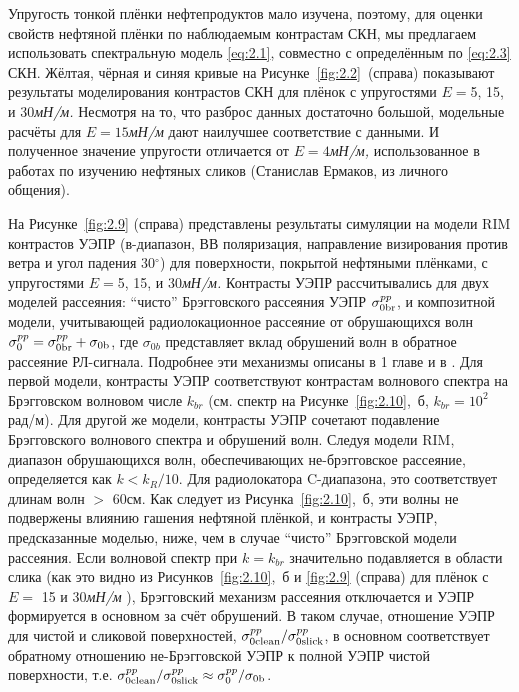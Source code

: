 Упругость тонкой плёнки нефтепродуктов мало изучена, поэтому, для оценки свойств нефтяной плёнки по наблюдаемым контрастам СКН, мы предлагаем использовать спектральную модель \eqref{eq:2.1}, совместно с определённым по \eqref{eq:2.3} СКН. Жёлтая, чёрная и синяя кривые на Рисунке~\ref{fig:2.2}~(справа) показывают результаты моделирования контрастов СКН для плёнок с упругостями $E=$5, 15, и 30\textit{мН/м.} Несмотря на то, что разброс данных достаточно большой, модельные расчёты для $E=15$\textit{мН/м }дают наилучшее соответствие с данными. И полученное значение упругости отличается от $E=4$\textit{мН/м,} использованное в работах по изучению нефтяных сликов (Станислав Ермаков, из личного общения).

На Рисунке~\ref{fig:2.9} (справа) представлены результаты симуляции на модели RIM контрастов УЭПР (в-диапазон, ВВ поляризация, направление визирования против ветра и угол падения 30${}^\circ$) для поверхности, покрытой нефтяными плёнками, с упругостями $E=$5, 15, и 30\textit{мН/м.} Контрасты УЭПР рассчитывались для двух моделей рассеяния: ``чисто'' Брэгговского рассеяния УЭПР ${\rm \sigma }_{0{\rm br}}^{pp} $, и композитной модели, учитывающей радиолокационное рассеяние от обрушающихся волн ${\rm \sigma }_{0}^{pp} ={\rm \sigma }_{0{\rm br}}^{pp} +{\rm \sigma }_{0{\rm b}} $, где $\sigma _{0b} $ представляет вклад обрушений волн в обратное рассеяние РЛ-сигнала. Подробнее эти механизмы описаны в 1 главе и в \citep{Kudryavtsev2005}. Для первой модели, контрасты УЭПР соответствуют контрастам волнового спектра на Брэгговском волновом числе $k_{br} $ (см. спектр на Рисунке~\ref{fig:2.10},~б, $k_{br} =10^{2} $рад/м). Для другой же модели, контрасты УЭПР сочетают подавление Брэгговского волнового спектра и обрушений волн. Следуя модели RIM, диапазон обрушающихся волн, обеспечивающих не-брэгговское рассеяние, определяется как $k<k_{R} /10$. Для радиолокатора C-диапазона, это соответствует длинам волн $>$ 60см. Как следует из Рисунка~\ref{fig:2.10},~б, эти волны не подвержены влиянию гашения нефтяной плёнкой, и контрасты УЭПР, предсказанные моделью, ниже, чем в случае ``чисто'' Брэгговской модели рассеяния. Если волновой спектр при $k=k_{br} $ значительно подавляется в области слика (как это видно из Рисунков~\ref{fig:2.10},~б и \ref{fig:2.9} (справа) для плёнок с $E=$ 15 и 30\textit{мН/м }), Брэгговский механизм рассеяния отключается и УЭПР формируется в основном за счёт обрушений. В таком случае, отношение УЭПР для чистой и сликовой поверхностей, ${\rm \sigma }_{0{\rm clean}}^{pp} /{\rm \sigma }_{0{\rm slick}}^{pp} $, в основном соответствует обратному отношению не-Брэгговской УЭПР к полной УЭПР чистой поверхности, т.е. ${\rm \sigma }_{0{\rm clean}}^{pp} /{\rm \sigma }_{0{\rm slick}}^{pp} \approx {\rm \sigma }_{0}^{pp} /{\rm \sigma }_{0{\rm b}} $.

